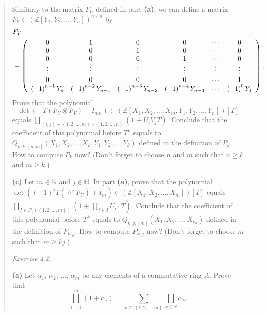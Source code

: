 \documentclass[numbers=enddot,12pt,final,onecolumn,notitlepage]{scrartcl}%
\begin{document}
\begin{quotation}
Similarly to the matrix $F_{U}$ defined in part \textbf{(a)}, we can define a
matrix $F_{V}\in\left(  \mathbb{Z}\left[  Y_{1},Y_{2},...,Y_{n}\right]
\right)  ^{n\times n}$ by%
\begin{align*}
&  F_{V}\\
&  =\left(
\begin{array}
[c]{cccccc}%
0 & 1 & 0 & 0 & \cdots & 0\\
0 & 0 & 1 & 0 & \cdots & 0\\
0 & 0 & 0 & 1 & \cdots & 0\\
\vdots & \vdots & \vdots & \vdots & \vdots & \vdots\\
0 & 0 & 0 & 0 & \cdots & 1\\
\left(  -1\right)  ^{n-1}Y_{n} & \left(  -1\right)  ^{n-2}Y_{n-1} & \left(
-1\right)  ^{n-3}Y_{n-2} & \left(  -1\right)  ^{n-4}Y_{n-3} & \cdots & \left(
-1\right)  ^{0}Y_{1}%
\end{array}
\right)  .
\end{align*}
Prove that the polynomial
\[
\det\left(  -T\left(  F_{U}\otimes F_{V}\right)  +I_{mn}\right)  \in\left(
\mathbb{Z}\left[  X_{1},X_{2},...,X_{m},Y_{1},Y_{2},...,Y_{n}\right]  \right)
\left[  T\right]
\]
equals $\prod\limits_{\left(  i,j\right)  \in\left\{  1,2,...,m\right\}
\times\left\{  1,2,...,n\right\}  }\left(  1+U_{i}V_{j}T\right)  .$ Conclude
that the coefficient of this polynomial before $T^{k}$ equals to
$Q_{k,k,\left[  n,m\right]  }\left(  X_{1},X_{2},...,X_{k},Y_{1}%
,Y_{2},...,Y_{k}\right)  $ defined in the definition of $P_{k}$. How to
compute $P_{k}$ now? (Don't forget to choose $n$ and $m$ such that $n\geq k$
and $m\geq k$.)

\textbf{(c)} Let $m\in\mathbb{N}$ and $j\in\mathbb{N}$. In part \textbf{(a)},
prove that the polynomial $\det\left(  \left(  -1\right)  ^{j}T\left(
\wedge^{j}F_{U}\right)  +I_{m}\right)  \in\left(  \mathbb{Z}\left[
X_{1},X_{2},...,X_{m}\right]  \right)  \left[  T\right]  $ equals
$\prod\limits_{I\in\mathcal{P}_{j}\left(  \left\{  1,2,...,m\right\}  \right)
}\left(  1+\prod\limits_{i\in I}U_{i}\cdot T\right)  $. Conclude that the
coefficient of this polynomial before $T^{k}$ equals to $Q_{k,j,\left[
m\right]  }\left(  X_{1},X_{2},...,X_{kj}\right)  $ defined in the definition
of $P_{k,j}$. How to compute $P_{k,j}$ now? (Don't forget to choose $m$ such
that $m\geq kj$.)

\textit{Exercise 4.2.}

\textbf{(a)} Let $\alpha_{1}$, $\alpha_{2}$, $...$, $\alpha_{m}$ be any
elements of a commutative ring $A$. Prove that%
\[
\prod\limits_{i=1}^{m}\left(  1+\alpha_{i}\right)  =\sum\limits_{S\subseteq
\left\{  1,2,...,m\right\}  }\prod\limits_{k\in S}\alpha_{k}.
\]



\end{quotation}
\end{document}
